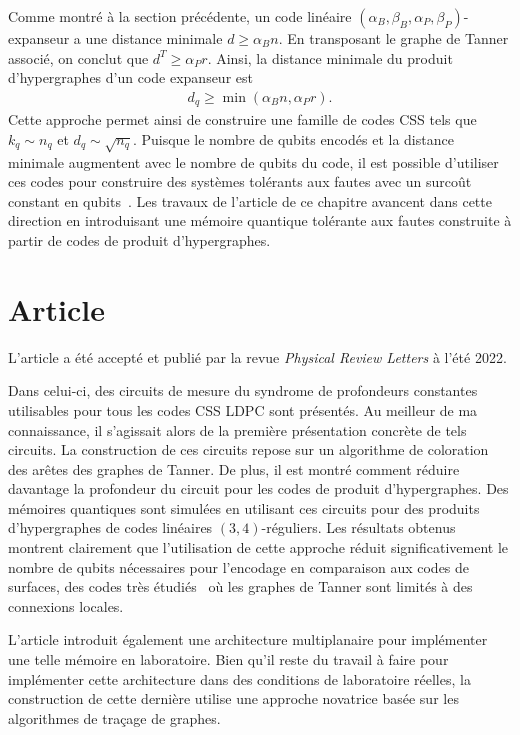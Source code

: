 Comme montré à la section précédente,
un code linéaire $(\alpha_B, \beta_B, \alpha_P, \beta_P)$-expanseur a une
distance minimale $d \geq \alpha_B n$.
En transposant le graphe de Tanner associé,
on conclut que $d^T \geq \alpha_P r$.
Ainsi,
la distance minimale du produit d'hypergraphes d'un code expanseur est~\cite{leverrier_quantum_2015}
\begin{align}
	d_q \geq \min(\alpha_B n, \alpha_P r).
\end{align}
Cette approche permet ainsi de construire une famille de codes CSS tels que
$k_q \sim n_q$ et $d_q \sim \sqrt{n_q}$.
Puisque le nombre de qubits encodés et la distance minimale augmentent avec le nombre 
de qubits du code,
il est possible d'utiliser ces codes pour construire des systèmes tolérants aux fautes
avec un surcoût constant en qubits~\cite{gottesman_fault-tolerant_2013}.
Les travaux de l'article de ce chapitre avancent dans cette direction 
en introduisant une mémoire quantique tolérante aux fautes construite
à partir de codes de produit d'hypergraphes.

\section{Article}

L'article a été accepté et publié par la revue \textit{Physical Review Letters} à l'été 2022.

Dans celui-ci,
des circuits de mesure du syndrome de profondeurs constantes utilisables
pour tous les codes CSS LDPC sont présentés.
Au meilleur de ma connaissance,
il s'agissait alors de la première présentation concrète de tels circuits.
La construction de ces circuits repose sur un algorithme de coloration des
arêtes des graphes de Tanner.
De plus,
il est montré comment réduire davantage la profondeur du circuit pour les codes 
de produit d'hypergraphes.
Des mémoires quantiques sont simulées en utilisant ces circuits pour des 
produits d'hypergraphes de codes linéaires $(3, 4)$-réguliers.
Les résultats obtenus montrent clairement que l'utilisation de cette approche
réduit significativement le nombre de qubits nécessaires pour l'encodage
en comparaison aux codes de surfaces,
des codes très étudiés~\cite{kitaev_fault-tolerant_2003, dennis_topological_2002, fowler_surface_2012, fowler_high_2009, stephens_fault-tolerant_2014, bravyi_efficient_2014, darmawan_tensor-network_2017} 
où les graphes de Tanner sont limités à des connexions locales.

L'article introduit également une architecture multiplanaire pour implémenter une telle mémoire
en laboratoire.
Bien qu'il reste du travail à faire pour implémenter cette architecture
dans des conditions de laboratoire réelles,
la construction de cette dernière utilise une approche novatrice basée sur les algorithmes de traçage de
graphes.

